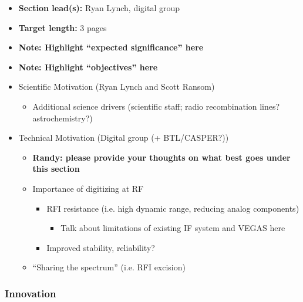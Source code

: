 \documentclass[10pt]{NSF}
\begin{document}
\begin{itemize}
\item{\textbf{Section lead(s):} Ryan Lynch, digital group}
\item{\textbf{Target length:} 3 pages}
\item{\textbf{Note: Highlight ``expected significance'' here}}
\item{\textbf{Note: Highlight ``objectives'' here}}
\item{Scientific Motivation (Ryan Lynch and Scott Ransom)}
  \begin{itemize}
  \item{Additional science drivers (scientific staff; radio
    recombination lines?  astrochemistry?)}
  \end{itemize}
\item{Technical Motivation (Digital group (+ BTL/CASPER?))}
  \begin{itemize}
  \item{\textbf{Randy: please provide your thoughts on what best goes
        under this section}}
  \item{Importance of digitizing at RF}
    \begin{itemize}
    \item{RFI resistance (i.e. high dynamic range, reducing analog
        components)}
      \begin{itemize}
      \item{Talk about limitations of existing IF system and VEGAS here}
      \end{itemize}
    \item{Improved stability, reliability?}
    \end{itemize}
  \item{``Sharing the spectrum'' (i.e. RFI excision)}
  \end{itemize}
\end{itemize}

\subsubsection{Innovation}
\label{sec:innovation}
\end{document}
